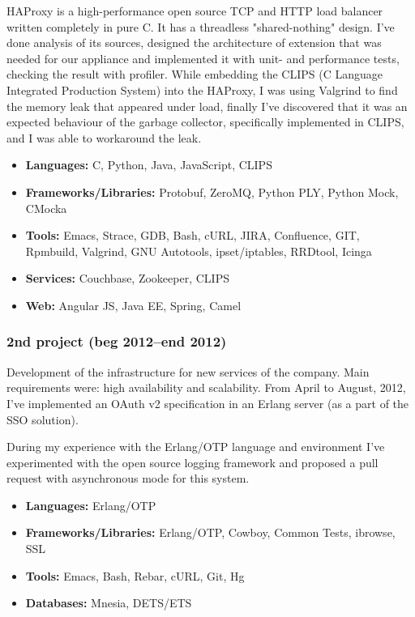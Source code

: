HAProxy is a high-performance open source TCP and HTTP load balancer written completely in pure C. It has a threadless "shared-nothing" design.
I've done analysis of its sources, designed the architecture of extension that was needed for our appliance and implemented it with unit- and
performance tests, checking the result with profiler. While embedding the CLIPS (C Language Integrated Production System) into the HAProxy, I was
using Valgrind to find the memory leak that appeared under load, finally I've discovered that it was an expected behaviour of the garbage collector,
specifically implemented in CLIPS, and I was able to workaround the leak.

\begin{itemize}[noitemsep, nosep]
  \item \textbf{Languages:} C, Python, Java, JavaScript, CLIPS
  \item \textbf{Frameworks/Libraries:} Protobuf, ZeroMQ, Python PLY, Python Mock, CMocka
  \item \textbf{Tools:} Emacs, Strace, GDB, Bash, cURL, JIRA, Confluence, GIT, Rpmbuild, Valgrind, GNU Autotools, ipset/iptables, RRDtool, Icinga
  \item \textbf{Services:} Couchbase, Zookeeper, CLIPS
  \item \textbf{Web:} Angular JS, Java EE, Spring, Camel
\end{itemize}

\subsubsection*{2nd project (beg 2012--end 2012)}
Development of the infrastructure for new services of the company. Main requirements were: high
availability and scalability. From April to August, 2012, I've implemented an OAuth v2 specification in an Erlang server (as a part of the SSO
solution).

During my experience with the Erlang/OTP language and environment I've experimented with the open source logging framework and proposed a pull
request with asynchronous mode for this system.

\begin{itemize}[noitemsep, nosep]
  \item \textbf{Languages:} Erlang/OTP
  \item \textbf{Frameworks/Libraries:} Erlang/OTP, Cowboy, Common Tests, ibrowse, SSL
  \item \textbf{Tools:} Emacs, Bash, Rebar, cURL, Git, Hg
  \item \textbf{Databases:} Mnesia, DETS/ETS
\end{itemize}

